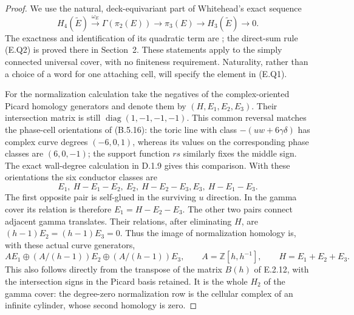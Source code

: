 \begin{proof}
We use the natural, deck-equivariant part of Whitehead's exact
sequence
\[
 H_4(\widetilde E)\xrightarrow{\omega_E}\Gamma(\pi_2(E))
       \longrightarrow\pi_3(E)\longrightarrow
 H_3(\widetilde E)\longrightarrow0.
 \tag{E.Q3}
\]
The exactness and identification of its quadratic term are
\cite[Theorems 1 and 5]{mapsWhitehead50}; the direct-sum rule
(E.Q2) is proved there in Section~2.  These statements apply
to the simply connected universal cover, with no finiteness
requirement.  Naturality, rather than a choice of a word for
one attaching cell, will specify the element in (E.Q1).

For the normalization calculation take the negatives of
the complex-oriented Picard homology generators and denote
them by $(H,E_1,E_2,E_3)$.  Their intersection matrix is
still $\operatorname{diag}(1,-1,-1,-1)$.  This common reversal
matches the phase-cell orientations of (B.5.16): the toric
line with class $-(uw+6\gamma\delta)$ has complex curve
degrees $(-6,0,1)$, whereas its values on the corresponding
phase classes are $(6,0,-1)$; the support function $rs$
similarly fixes the middle sign.  The exact wall-degree
calculation in D.1.9 gives this comparison.  With these
orientations the six conductor classes are
\[
 E_1,\ H-E_1-E_2,\ E_2,\ H-E_2-E_3,
                                      E_3,\ H-E_1-E_3.
\]
The first opposite pair is self-glued in the surviving $u$
direction.  In the gamma cover its relation is therefore
$E_1=H-E_2-E_3$.  The other two pairs connect adjacent gamma
translates.  Their relations, after eliminating $H$, are
$(h-1)E_2=(h-1)E_3=0$.  Thus the image of normalization
homology is, with these actual curve generators,
\[
 A E_1\oplus(A/(h-1))E_2\oplus(A/(h-1))E_3,
 \qquad A=\mathbb Z[h,h^{-1}],\qquad H=E_1+E_2+E_3.
 \tag{E.Q4}
\]
This also follows directly from the transpose of the matrix
$B(h)$ of E.2.12, with the intersection signs in the Picard
basis retained.  It is the whole $H_2$ of the gamma cover:
the degree-zero normalization row is the cellular complex
of an infinite cylinder, whose second homology is zero.


\end{proof}
